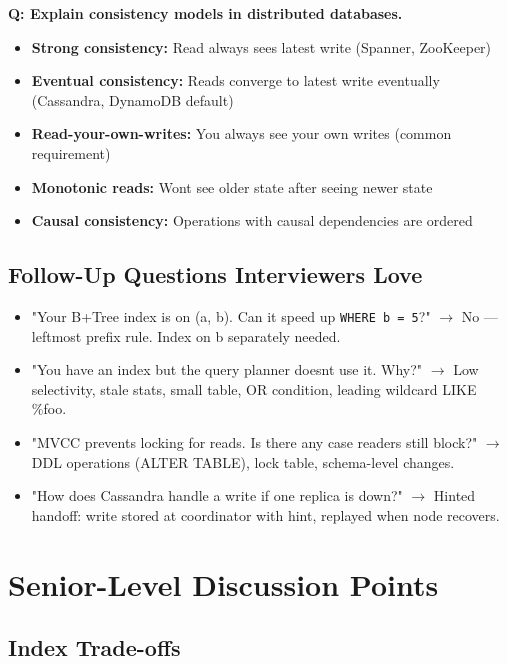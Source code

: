 \documentclass[11pt]{article}
\providecommand{\tightlist}{\setlength{\itemsep}{1pt}\setlength{\parskip}{0pt}}
\begin{document}
\textbf{Q: Explain consistency models in distributed databases.}

\begin{itemize}
\tightlist
\item
  \textbf{Strong consistency:} Read always sees latest write (Spanner, ZooKeeper)
\item
  \textbf{Eventual consistency:} Reads converge to latest write eventually (Cassandra, DynamoDB default)
\item
  \textbf{Read-your-own-writes:} You always see your own writes (common requirement)
\item
  \textbf{Monotonic reads:} Won\textquotesingle t see older state after seeing newer state
\item
  \textbf{Causal consistency:} Operations with causal dependencies are ordered
\end{itemize}

\subsection{Follow-Up Questions Interviewers Love}\label{follow-up-questions-interviewers-love}

\begin{itemize}
\tightlist
\item
  "Your B+Tree index is on (a, b). Can it speed up \texttt{WHERE\ b\ =\ 5}?" \(\rightarrow\) No --- leftmost prefix rule. Index on b separately needed.
\item
  "You have an index but the query planner doesn\textquotesingle t use it. Why?" \(\rightarrow\) Low selectivity, stale stats, small table, OR condition, leading wildcard LIKE \textquotesingle\%foo\textquotesingle.
\item
  "MVCC prevents locking for reads. Is there any case readers still block?" \(\rightarrow\) DDL operations (ALTER TABLE), lock table, schema-level changes.
\item
  "How does Cassandra handle a write if one replica is down?" \(\rightarrow\) Hinted handoff: write stored at coordinator with hint, replayed when node recovers.
\end{itemize}

\section{Senior-Level Discussion Points}\label{senior-level-discussion-points}

\subsection{Index Trade-offs}\label{index-trade-offs}
\end{document}
